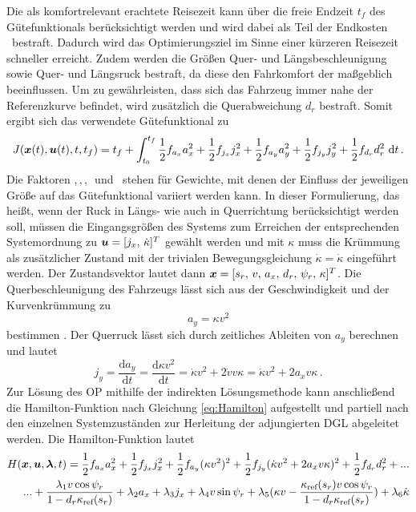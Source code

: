 Die als komfortrelevant erachtete Reisezeit kann über die freie Endzeit $t_f$ des Gütefunktionals berücksichtigt werden und wird dabei als Teil der Endkosten \Vofxoftf~bestraft. Dadurch wird das Optimierungsziel im Sinne einer kürzeren Reisezeit schneller erreicht. Zudem werden die Größen Quer- und Längsbeschleunigung sowie Quer- und Längsruck bestraft, da diese den Fahrkomfort der  maßgeblich beeinflussen. Um zu gewährleisten, dass sich das Fahrzeug immer nahe der Referenzkurve befindet, wird zusätzlich die Querabweichung $d_r$ bestraft. Somit ergibt sich das verwendete Gütefunktional zu
\begin{equation}
	J(\boldsymbol{x}(t),\boldsymbol{u}(t),t,t_f) = t_f + \int_{t_0}^{t_f} \frac{1}{2}f_{a_x} a_x^2 + \frac{1}{2}f_{j_x} j_x^2 + \frac{1}{2}f_{a_y} a_y^2 + \frac{1}{2}f_{j_y} j_y^2 + \frac{1}{2}f_{d_r} d_r^2~\textrm{d}{t}\,. \label{eq:J_eingesetzt}
\end{equation}
Die Faktoren \fax,\,\fjx,\,\fay,\,\fjy~und \fdr~stehen für Gewichte, mit denen der Einfluss der jeweiligen Größe auf das Gütefunktional variiert werden kann. In dieser Formulierung, das heißt, wenn der Ruck in Längs- wie auch in Querrichtung berücksichtigt werden soll, müssen die Eingangsgrößen des Systems zum Erreichen der entsprechenden Systemordnung zu $\boldsymbol{u} = [j_x,\,\dot{\kappa}]^T$ gewählt werden und mit $\kappa$ muss die Krümmung als zusätzlicher Zustand mit der trivialen Bewegungsgleichung $\dot{\kappa} = \dot{\kappa}$ eingeführt werden. Der Zustandsvektor lautet dann $\boldsymbol{x} = [s_r,\,v,\,a_x,\,d_r,\,\psi_r,\,\kappa]^T$. Die Querbeschleunigung des Fahrzeugs lässt sich aus der Geschwindigkeit und der Kurvenkrümmung zu 
\begin{equation}
	a_y = \kappa v^2 \label{eq:ay}
\end{equation}
bestimmen \cite{Schramm.2013}. Der Querruck lässt sich durch zeitliches Ableiten von $a_y$ berechnen und lautet
\begin{equation}
j_y = \frac{\textrm{d} a_y}{\textrm{d} t} = \frac{\textrm{d} \kappa v^2}{\textrm{d} t} = \dot{\kappa}v^2 + 2\dot{v}v\kappa  = \dot{\kappa}v^2 + 2a_xv\kappa\,. \label{eq:jy}
\end{equation}
Zur Lösung des \gls{OP} mithilfe der indirekten Lösungsmethode kann anschließend die Hamilton-Funktion nach Gleichung \eqref{eq:Hamilton} aufgestellt und partiell nach den einzelnen Systemzuständen zur Herleitung der adjungierten \gls{DGL} abgeleitet werden. Die Hamilton-Funktion lautet
\begin{equation}
\begin{split}
H(\boldsymbol{x},\boldsymbol{u},\boldsymbol{\lambda},t) = \frac{1}{2}f_{a_x} a_x^2 + \frac{1}{2}f_{j_x} j_x^2 + \frac{1}{2}f_{a_y} (\kappa v^2)^2 + \frac{1}{2}f_{j_y} (\dot{\kappa}v^2 + 2a_xv\kappa)^2 + \frac{1}{2}f_{d_r} d_r^2 + ... \\
... + \frac{\lambda_1v\cos{\psi_r}}{1-d_r\kappa_{\textrm{ref}}(s_r)} + \lambda_2a_x + \lambda_3j_x + \lambda_4v\sin{\psi_r} + \lambda_5(\kappa v - \frac{\kappa_{\textrm{ref}}(s_r) v\cos{\psi_r}}{1-d_r\kappa_{\textrm{ref}}(s_r)}) + \lambda_6\dot{\kappa} \label{eq:Hamilton_eingesetzt}
\end{split}
\end{equation}
